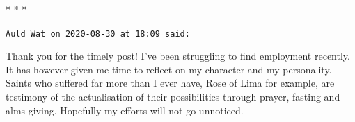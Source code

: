 
\begin{center}* * *\end{center}

\begin{footnotesize}\begin{sffamily}



\texttt{Auld Wat on 2020-08-30 at 18:09 said: }

Thank you for the timely post! I've been struggling to find employment recently. It has however given me time to reflect on my character and my personality. Saints who suffered far more than I ever have, Rose of Lima for example, are testimony of the actualisation of their possibilities through prayer, fasting and alms giving. Hopefully my efforts will not go unnoticed.


\end{sffamily}\end{footnotesize}
